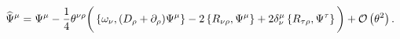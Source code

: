 \begin{equation}
\widehat\Psi^\mu=\Psi^\mu-\frac{1}{4}\theta^{\nu\rho}
\bigg(\left\{\omega_\nu,(D_\rho+\partial_\rho)\Psi^\mu\right\}-2\left\{R_{\nu\rho},
\Psi^\mu\right\}+2\delta_\nu^\mu\left\{R_{\tau\rho},\Psi^\tau\right\}\bigg)
+{\cal O}\left( \theta ^{2}\right).
\end{equation}


